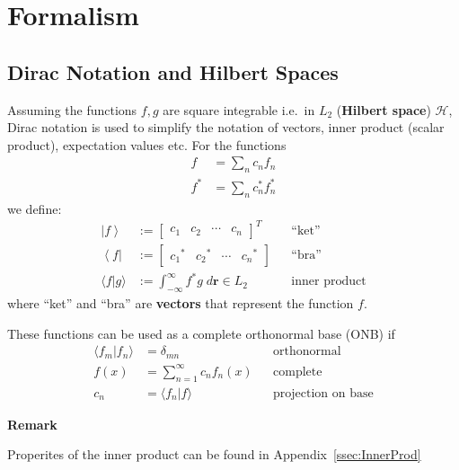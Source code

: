 \section{Formalism}

\subsection{Dirac Notation and Hilbert Spaces}
Assuming the functions $f,g$ are square integrable i.e.\ in $L_2$ (\textbf{Hilbert space}) $\mathcal{H}$,
Dirac notation is used to simplify the notation of vectors, inner product (scalar product), expectation values etc. For the functions
\begin{align*}
    f   & = \sum_n c_n f_n     \\
    f^* & = \sum_n c_n^* f_n^*
\end{align*}
we define:
\noindent\begin{align*}
    \left|f\right\rangle  & := \begin{bmatrix}
                                   c_1 & c_2 & \cdots & c_n
                               \end{bmatrix}^T                               &  & \text{``ket''}              \\
    \left\langle f\right| & := \begin{bmatrix}
                                   {c_1}^* & {c_2}^* & \cdots & {c_n}^*
                               \end{bmatrix}                   &  & \text{``bra''}                            \\
    \langle f|g \rangle   & := \int_{-\infty}^{\infty} f^* g\; d \mathbf{r} \in L_2 &  & \text{inner product}
\end{align*}
where ``ket'' and ``bra'' are \textbf{vectors} that represent the function $f$.

These functions can be used as a complete orthonormal base (ONB) if
\noindent\begin{align*}
    \langle f_m|f_n \rangle & = \delta_{mn}                    &  & \text{orthonormal}        \\
    f(x)                    & = \sum_{n=1}^{\infty} c_n f_n(x) &  & \text{complete}           \\
    c_n                     & = \langle f_n|f \rangle          &  & \text{projection on base}
\end{align*}

\textbf{Remark}

Properites of the inner product can be found in Appendix\ \ref{ssec:InnerProd}

